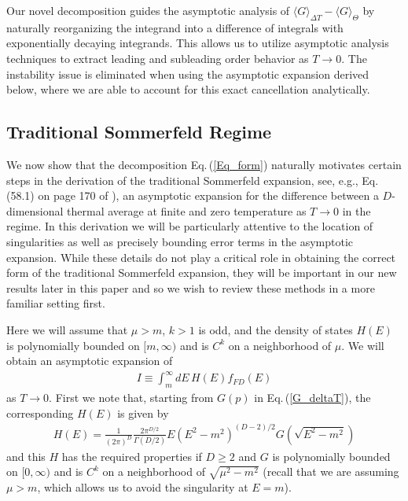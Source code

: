 \documentclass[sn-mathphys,Numbered]{sn-jnl}
\newcommand{\req}[1]{Eq.\,(\ref{#1})}
\begin{document}
Our novel decomposition guides the asymptotic analysis of $\langle G\rangle_{\Delta T}-\langle G\rangle_\Theta$ by naturally reorganizing the integrand into a difference of integrals with exponentially decaying integrands. This allows us to utilize asymptotic analysis techniques to extract leading and subleading order behavior as $T\to 0$. The instability issue is eliminated when using the asymptotic expansion derived below, where we are able to account for this exact cancellation analytically. 






\subsection{Traditional Sommerfeld Regime}\label{sec:traditional_Sommerfeld}
We now show that the decomposition \req{Eq_form} naturally motivates certain steps in the derivation of the traditional Sommerfeld expansion, see, e.g., Eq. (58.1) on page 170 of \cite{landau2013statistical}), an asymptotic expansion for the difference between a $D$-dimensional thermal average at finite and zero temperature as $T\to 0$ in the regime. In this derivation we will be particularly attentive to the location of singularities as well as precisely bounding error terms in the asymptotic expansion. While these details do not play a critical role in obtaining the correct form of the traditional Sommerfeld expansion, they will be important in our new results later in this paper and so we wish to review these methods in a more familiar setting first.


Here we will assume that $\mu>m$, $k>1$ is odd, and the density of states $H(E)$ is polynomially bounded on $[m,\infty)$ and is $C^k$ on a neighborhood of $\mu$. We will obtain an asymptotic expansion of 
\begin{align}\label{eq:traditional_sommerfeld_I}
 I\equiv\int_m^\infty dE\, H(E) f_{FD}(E)
\end{align}
as $T\to 0$. First we note that, starting from $G(p)$ in \req{G_deltaT}, the corresponding $H(E)$ is given by
\begin{align}
 H(E)= \frac{1}{(2\pi)^D}\frac{2\pi^{D/2}}{\Gamma(D/2)} E(E^2-m^2)^{(D-2)/2} G(\sqrt{E^2-m^2}) 
\end{align}
and this $H$ has the required properties if $D\geq 2$ and $G$ is polynomially bounded on $[0,\infty)$ and is $C^k$ on a neighborhood of $\sqrt{\mu^2-m^2}$ (recall that we are assuming $\mu>m$, which allows us to avoid the singularity at $E=m$).
\end{document}
